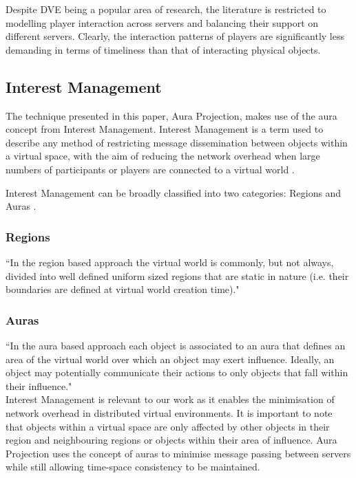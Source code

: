 Despite DVE being a popular area of research, the literature is restricted to modelling player interaction across servers and balancing their support on different servers. Clearly, the interaction patterns of players are significantly less demanding in terms of timeliness than that of interacting physical objects.


\subsection{Interest Management}
The technique presented in this paper, Aura Projection, makes use of the aura concept from Interest Management. Interest Management is a term used to describe any method of restricting message dissemination between objects within a virtual space, with the aim of reducing the network overhead when large numbers of participants or players are connected to a virtual world \cite{Morgan2005}.

Interest Management can be broadly classified into two categories: Regions and Auras \cite{Morgan2005, storey2004determining}.
\subsubsection{Regions}
``In the region based approach the virtual world is commonly, but not always, divided into well defined uniform sized regions that are static in nature (i.e. their boundaries are defined at virtual world creation time)."\cite{storey2004determining}
\subsubsection{Auras}
``In the aura based approach each object is associated to an aura that defines an area of the virtual world over which an object may exert influence. Ideally, an object may potentially communicate their actions to only objects that fall within their influence."\cite{storey2004determining}\\

Interest Management is relevant to our work as it enables the minimisation of network overhead in distributed virtual environments. It is important to note that objects within a virtual space are only affected by other objects in their region and neighbouring regions or objects within their area of influence. Aura Projection uses the concept of auras to minimise message passing between servers while still allowing time-space consistency to be maintained.


